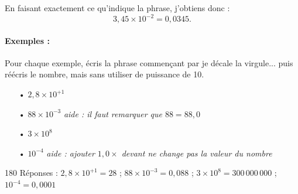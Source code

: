 \documentclass[12pt,a4paper]{article}
\begin{document}
En faisant exactement ce qu'indique la phrase, j'obtiens donc :
\[
3{,}45 \times 10^{-2} = 0{,}0345.
\]

\paragraph*{Exemples :} Pour chaque exemple, écris la phrase commençant par \og je décale la virgule... \fg{} puis réécris le nombre, mais sans utiliser de puissance de 10.
\begin{itemize}
\item[•] $2{,}8\times10^{+1}$
\item[•] $88\times10^{-3}$ \hfill \emph{aide : il faut remarquer que $88 = 88{,}0$}
\item[•] $3\times10^{8}$
\item[•] $10^{-4}$ \hfill \emph{aide : ajouter $1{,}0\times$ devant ne change pas la valeur du nombre}
\end{itemize}


\flushright
\footnotesize
\begin{turn}{180}
Réponses :
$2{,}8\times10^{+1} = 28$ \quad ; \quad
$88\times10^{-3} = 0{,}088$ \quad ; \quad
$3\times10^{8} = 300\, 000\, 000$ \quad ; \quad
$10^{-4} = 0{,}0001$
\hfill
\end{turn}
\end{document}
